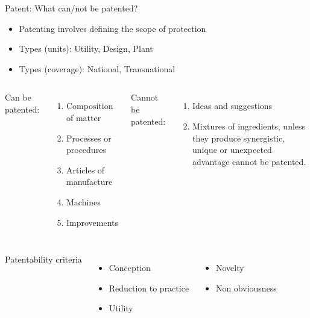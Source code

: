 \documentclass[ignorenonframetext,aspectratio=169]{beamer}
\providecommand{\tightlist}{%
  \setlength{\itemsep}{0pt}\setlength{\parskip}{0pt}}
\begin{document}
\begin{frame}{Patent: What can/not be patented?}
\protect\hypertarget{patent-what-cannot-be-patented}{}

\footnotesize

\begin{itemize}
\tightlist
\item
  Patenting involves defining the scope of protection
\item
  Types (units): Utility, Design, Plant
\item
  Types (coverage): National, Transnational
\end{itemize}

\begin{columns}[T,onlytextwidth]
  \footnotesize
  Can be patented:
  \begin{enumerate}
  \item Composition of matter
  \item Processes or procedures
  \item Articles of manufacture
  \item Machines
  \item Improvements
  \end{enumerate}
  
  Cannot be patented:
  \begin{enumerate}
  \item Ideas and suggestions
  \item Mixtures of ingredients, unless they produce synergistic, unique or unexpected advantage cannot be patented.
  \end{enumerate}
\end{columns}

\begin{columns}[T,onlytextwidth]
  \footnotesize
  \vspace{0.8cm}
  Patentability criteria
  \begin{itemize}
  \item Conception
  \item Reduction to practice
  \item Utility
  \end{itemize}
  
  \vspace{0.8cm}
  \begin{itemize}
  \item Novelty
  \item Non obviousness
  \end{itemize}
\end{columns}

\end{frame}
\end{document}
